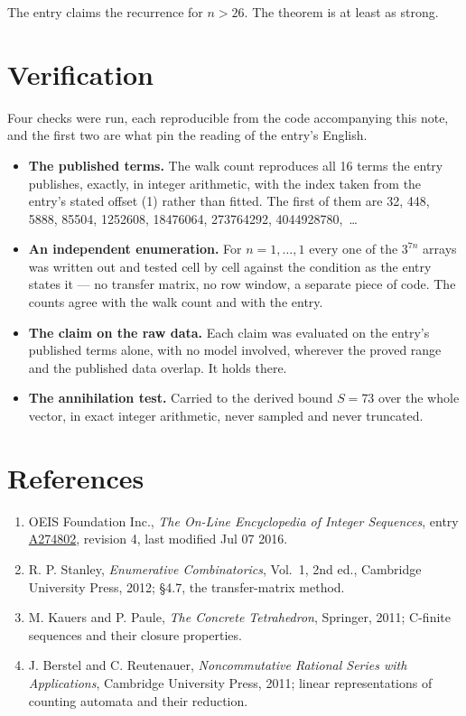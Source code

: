 \documentclass[11pt]{article}
\theoremstyle{definition}
\begin{document}
The entry claims the recurrence for $n > 26$. The theorem is at least as strong.

\section{Verification}

Four checks were run, each reproducible from the code accompanying this note, and the first two are what pin the reading of the entry's English.

\begin{itemize}

\item {\bfseries The published terms.} The walk count reproduces all 16 terms the entry publishes, exactly, in integer arithmetic, with the index taken from the entry's stated offset (1) rather than fitted. The first of them are 32, 448, 5888, 85504, 1252608, 18476064, 273764292, 4044928780,~\dots

\item {\bfseries An independent enumeration.} For $n = 1,\dots,1$ every one of the $3^{7n}$ arrays was written out and tested cell by cell against the condition as the entry states it --- no transfer matrix, no row window, a separate piece of code. The counts agree with the walk count and with the entry.

\item {\bfseries The claim on the raw data.} Each claim was evaluated on the entry's published terms alone, with no model involved, wherever the proved range and the published data overlap. It holds there.

\item {\bfseries The annihilation test.} Carried to the derived bound $S = 73$ over the whole vector, in exact integer arithmetic, never sampled and never truncated.

\end{itemize}

\section{References}

\begin{enumerate}

\item OEIS Foundation Inc., \emph{The On-Line Encyclopedia of Integer Sequences}, entry \href{https://oeis.org/A274802}{A274802}, revision 4, last modified Jul 07 2016.

\item R. P. Stanley, \emph{Enumerative Combinatorics}, Vol.~1, 2nd ed., Cambridge University Press, 2012; \S4.7, the transfer-matrix method.

\item M. Kauers and P. Paule, \emph{The Concrete Tetrahedron}, Springer, 2011; C-finite sequences and their closure properties.

\item J. Berstel and C. Reutenauer, \emph{Noncommutative Rational Series with Applications}, Cambridge University Press, 2011; linear representations of counting automata and their reduction.

\end{enumerate}
\end{document}
